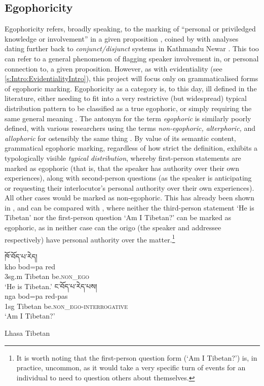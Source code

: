 \subsection{Egophoricity}\label{s:Intro:EgophoricityIntro}
Egophoricity refers, broadly speaking, to the marking of ``personal or priviledged knowledge or involvement'' in a given proposition \cite[2]{EgoIntro}, coined by  with analyses dating further back to \textit{conjunct/disjunct} systems in Kathmandu Newar \cite[Newaric: Nepal, ][]{HaleNewar1980}. This too can refer to a general phenomenon of flagging speaker involvement in, or personal connection to, a given proposition. However, as with evidentiality (see \ref{s:Intro:EvidentialityIntro}), this project will focus only on grammaticalised forms of egophoric marking. Egophoricity as a category is, to this day, ill defined in the literature, either needing to fit into a very restrictive (but widespread) typical distribution pattern to be classified as a true egophoric, or simply requiring the same general meaning \cites{EgoIntro}{Gawne2017}. The antonym for the term \textit{egophoric} is similarly poorly defined, with various researchers using the terms \textit{non-egophoric, alterphoric,} and \textit{allophoric} for ostensibly the same thing \cite{Widmer2020}. By value of its semantic content, grammatical egophoric marking, regardless of how strict the definition, exhibits a typologically visible \textit{typical distribution}, whereby first-person statements are marked as egophoric (that is, that the speaker has authority over their own experiences), along with second-person questions (as the speaker is anticipating or requesting their interlocutor's personal authority over their own experiences). All other cases would be marked as non-egophoric. This has already been shown in , and can be compared with , where neither the third-person statement `He is Tibetan' nor the first-person question `Am I Tibetan?' can be marked as egophoric, as in neither case can the origo (the speaker and addressee respectively) have personal authority over the matter.\footnote{It is worth noting that the first-person question form (`Am I Tibetan?') is, in practice, uncommon, as it would take a very specific turn of events for an individual to need to question others about themselves.}

\begin{exe}
\ex\label{ex:EgoDistribution}
\begin{xlist}
\ex 
\glll \texttibetan{ཁོ་བོད་པ་རེད།} \\
kho bod=pa red \\
3sg.m Tibetan be.\textsc{non\_ego} \\
\glt `He is Tibetan.'
\ex 
\glll \texttibetan{ང་བོད་པ་རེད་པས།} \\
nga bod=pa red-pas \\
1sg Tibetan be.\textsc{non\_ego}-\textsc{interrogative} \\
\glt `Am I Tibetan?'
\end{xlist}
Lhasa Tibetan \cite[Tibetic: PRC,][394]{DeLancey2017Tibetan}
\end{exe}

